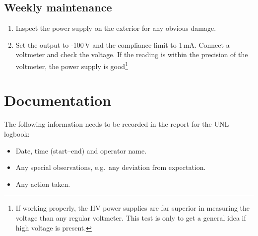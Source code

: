 \documentclass[12pt]{unlsilabsop}
\begin{document}
\subsection{Weekly maintenance}
\begin{enumerate}
    \item Inspect the power supply on the exterior for any obvious damage.
    \item Set the output to -100\,V and the compliance limit to 1\,mA. Connect a voltmeter and check the voltage. If the reading is within the precision of the voltmeter, the power supply is good\footnote{If working properly, the HV power supplies are far superior in measuring the voltage than any regular voltmeter. This test is only to get a general idea if high voltage is present.}
\end{enumerate}

\section{Documentation}
The following information needs to be recorded in the report for the UNL logbook:
\begin{itemize}
    \item Date, time (start--end) and operator name.
    \item Any special observations, e.g.~any deviation from expectation.
    \item Any action taken.
\end{itemize}
\end{document}

